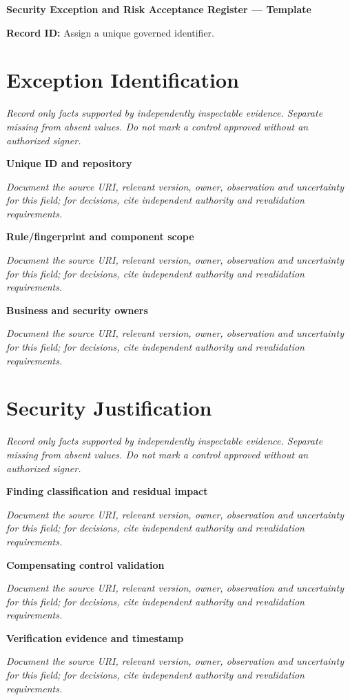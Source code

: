 \documentclass[11pt,letterpaper]{article}
\begin{document}
\begin{center}{\LARGE\bfseries Security Exception and Risk Acceptance Register --- Template}\par
\vspace{4pt}{\small Guided authoring instrument (not a completed assessment)}\par
\end{center}
\noindent\textbf{Record ID:} Assign a unique governed identifier.\par
\section{Exception Identification}
\noindent\emph{Record only facts supported by independently inspectable evidence. Separate missing from absent values. Do not mark a control approved without an authorized signer.}\par
\noindent\textbf{Unique ID and repository}\par
\noindent\emph{Document the source URI, relevant version, owner, observation and uncertainty for this field; for decisions, cite independent authority and revalidation requirements.}\par\medskip
\noindent\textbf{Rule/fingerprint and component scope}\par
\noindent\emph{Document the source URI, relevant version, owner, observation and uncertainty for this field; for decisions, cite independent authority and revalidation requirements.}\par\medskip
\noindent\textbf{Business and security owners}\par
\noindent\emph{Document the source URI, relevant version, owner, observation and uncertainty for this field; for decisions, cite independent authority and revalidation requirements.}\par\medskip
\section{Security Justification}
\noindent\emph{Record only facts supported by independently inspectable evidence. Separate missing from absent values. Do not mark a control approved without an authorized signer.}\par
\noindent\textbf{Finding classification and residual impact}\par
\noindent\emph{Document the source URI, relevant version, owner, observation and uncertainty for this field; for decisions, cite independent authority and revalidation requirements.}\par\medskip
\noindent\textbf{Compensating control validation}\par
\noindent\emph{Document the source URI, relevant version, owner, observation and uncertainty for this field; for decisions, cite independent authority and revalidation requirements.}\par\medskip
\noindent\textbf{Verification evidence and timestamp}\par
\noindent\emph{Document the source URI, relevant version, owner, observation and uncertainty for this field; for decisions, cite independent authority and revalidation requirements.}\par\medskip
\end{document}
